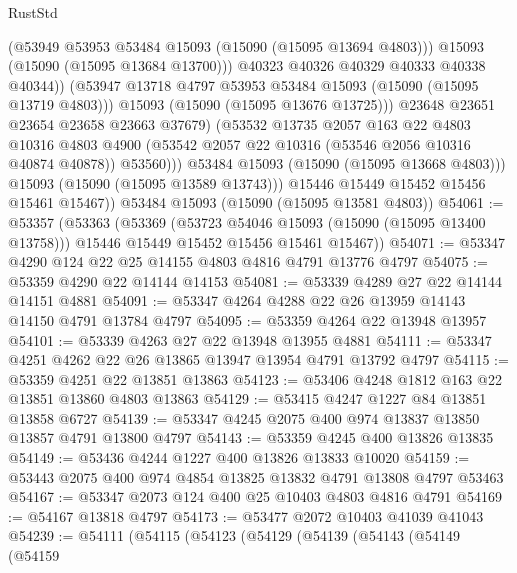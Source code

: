 \begin{lexlean}{RustStd}
\begin{coremodule}
                          (@53949 @53953 @53484 @15093 (@15090 (@15095 @13694 @4803)))
                          @15093
                          (@15090 (@15095 @13684 @13700)))
                        @40323
                        @40326
                        @40329
                        @40333
                        @40338
                        @40344))
                    (@53947 @13718 @4797 @53953 @53484 @15093 (@15090 (@15095 @13719 @4803)))
                    @15093
                    (@15090 (@15095 @13676 @13725)))
                  @23648
                  @23651
                  @23654
                  @23658
                  @23663
                  @37679)
                (@53532
                  @13735
                  @2057
                  @163
                  @22
                  @4803
                  @10316
                  @4803
                  @4900
                  (@53542 @2057 @22 @10316 (@53546 @2056 @10316 @40874 @40878))
                  @53560)))
            @53484
            @15093
            (@15090 (@15095 @13668 @4803)))
          @15093
          (@15090 (@15095 @13589 @13743)))
        @15446
        @15449
        @15452
        @15456
        @15461
        @15467))
    @53484
    @15093
    (@15090 (@15095 @13581 @4803))
@54061 := @53357
    (@53363
      (@53369
        (@53723 @54046 @15093 (@15090 (@15095 @13400 @13758)))
        @15446
        @15449
        @15452
        @15456
        @15461
        @15467))
@54071 := @53347 @4290 @124 @22 @25 @14155 @4803 @4816 @4791 @13776 @4797
@54075 := @53359 @4290 @22 @14144 @14153
@54081 := @53339 @4289 @27 @22 @14144 @14151 @4881
@54091 := @53347 @4264 @4288 @22 @26 @13959 @14143 @14150 @4791 @13784 @4797
@54095 := @53359 @4264 @22 @13948 @13957
@54101 := @53339 @4263 @27 @22 @13948 @13955 @4881
@54111 := @53347 @4251 @4262 @22 @26 @13865 @13947 @13954 @4791 @13792 @4797
@54115 := @53359 @4251 @22 @13851 @13863
@54123 := @53406 @4248 @1812 @163 @22 @13851 @13860 @4803 @13863
@54129 := @53415 @4247 @1227 @84 @13851 @13858 @6727
@54139 := @53347 @4245 @2075 @400 @974 @13837 @13850 @13857 @4791 @13800 @4797
@54143 := @53359 @4245 @400 @13826 @13835
@54149 := @53436 @4244 @1227 @400 @13826 @13833 @10020
@54159 := @53443 @2075 @400 @974 @4854 @13825 @13832 @4791 @13808 @4797 @53463
@54167 := @53347 @2073 @124 @400 @25 @10403 @4803 @4816 @4791
@54169 := @54167 @13818 @4797
@54173 := @53477 @2072 @10403 @41039 @41043
@54239 := @54111
    (@54115
      (@54123
        (@54129
          (@54139
            (@54143
              (@54149
                (@54159

\end{coremodule}
\end{lexlean}
